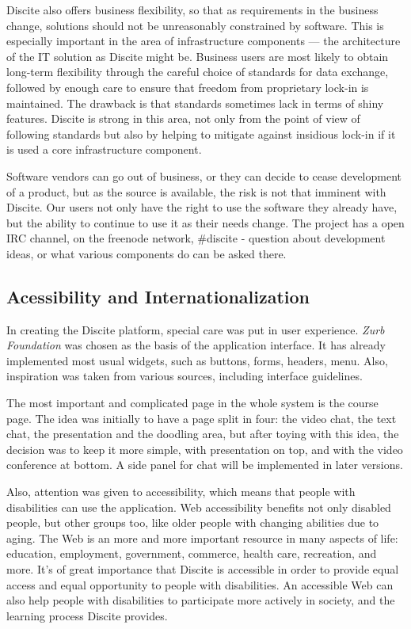 Discite also offers business flexibility, so that as requirements in the
business change, solutions should not be unreasonably constrained by software.
This is especially important in the area of infrastructure components — the
architecture of the IT solution as Discite might be.  Business users are most
likely to obtain long-term flexibility through the careful choice of standards
for data exchange, followed by enough care  to ensure that freedom from
proprietary lock-in is maintained. The drawback is that standards sometimes lack
in terms of shiny features. Discite is strong in this area, not only from the
point of view of following standards but also by helping to mitigate against
insidious lock-in if it is used a core infrastructure component.

Software vendors can go out of business, or they can decide to cease
development of a product, but as the source is available, the risk is not that
imminent with Discite. Our users not only have  the right to use the software
they already have, but the ability to continue to use it as their needs change.
The project has a open IRC channel, on the freenode network, \#discite - question
about development ideas, or what various components do can be asked there.

\subsection{Acessibility and Internationalization} In creating the Discite
platform, special care was put in user experience. \textit{Zurb Foundation} was chosen
as the basis of the application interface. It has already implemented most usual
widgets, such as buttons, forms, headers, menu.  Also, inspiration was taken
from various sources, including interface guidelines.

The most important and complicated page in the whole system is the course page.
The idea was initially to have a page split in four: the video chat, the text
chat, the presentation and the doodling area, but after toying with this idea,
the decision was to keep it more simple, with presentation on top, and with the
video conference at bottom. A side panel for chat will be implemented in later
versions.

Also, attention was given to accessibility, which  means that people with
disabilities can use the application. Web accessibility benefits not only disabled people,
but other groups too, like older people with changing abilities due to aging.
The Web is an more and more important resource in many aspects of life: education,
employment, government, commerce, health care, recreation, and more. It's of great
importance that Discite is accessible in order to provide equal access and equal
opportunity to people with disabilities. An accessible Web can also help people
with disabilities to participate more actively in society, and the learning process
Discite provides.

